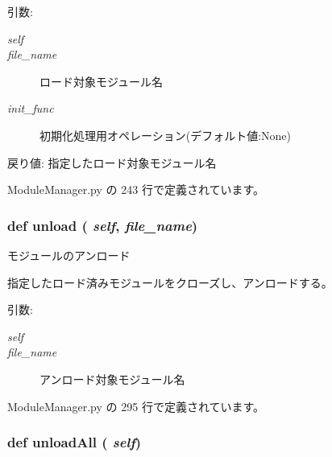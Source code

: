 \begin{Desc}
\item[引数:]
\begin{description}
\item[{\em self}]\item[{\em file\_\-name}]ロード対象モジュール名 \item[{\em init\_\-func}]初期化処理用オペレーション(デフォルト値:None)\end{description}
\end{Desc}
\begin{Desc}
\item[戻り値:]指定したロード対象モジュール名 \end{Desc}


 ModuleManager.py の 243 行で定義されています。
\subsubsection{\setlength{\rightskip}{0pt plus 5cm}def unload ( {\em self},  {\em file\_\-name})}\label{classsource__py_1_1_module_manager_1_1_module_manager_ee3f02401627b3e5ebe960808e0aebf0}


モジュールのアンロード 

指定したロード済みモジュールをクローズし、アンロードする。

\begin{Desc}
\item[引数:]
\begin{description}
\item[{\em self}]\item[{\em file\_\-name}]アンロード対象モジュール名 \end{description}
\end{Desc}


 ModuleManager.py の 295 行で定義されています。
\subsubsection{\setlength{\rightskip}{0pt plus 5cm}def unloadAll ( {\em self})}\label{classsource__py_1_1_module_manager_1_1_module_manager_0b20f78be276cae8b95a2fa4c4fc715d}


